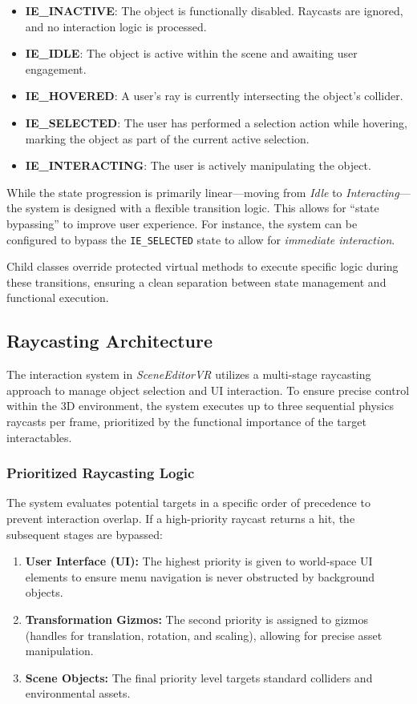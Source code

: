 \documentclass[inscr,ack,preface]{dithesis}
\begin{document}
\begin{itemize}
  \item \textbf{IE\_INACTIVE}: The object is functionally disabled. Raycasts are ignored, and no interaction logic is processed.
  \item \textbf{IE\_IDLE}: The object is active within the scene and awaiting user engagement.
  \item \textbf{IE\_HOVERED}: A user's ray is currently intersecting the object’s collider.
  \item \textbf{IE\_SELECTED}: The user has performed a selection action while hovering, marking the object as part of the current
        active selection.
  \item \textbf{IE\_INTERACTING}: The user is actively manipulating the object.
\end{itemize}

While the state progression is primarily linear—moving from \textit{Idle} to
\textit{Interacting}—the system is designed with a flexible transition logic.
This allows for ``state bypassing'' to improve user experience.
For instance, the system can be configured to bypass the \texttt{IE\_SELECTED}
state to allow for \textit{immediate interaction}.

Child classes override protected virtual methods to execute specific logic
during these transitions, ensuring a clean separation between state management and functional execution.
\subsection{Raycasting Architecture}

The interaction system in \textit{SceneEditorVR} utilizes a multi-stage raycasting approach
to manage object selection and UI interaction. To ensure precise control within the 3D environment,
the system executes up to three sequential physics raycasts per frame, prioritized by the functional importance of the target interactables.

\subsubsection{Prioritized Raycasting Logic}
The system evaluates potential targets in a specific order of precedence to prevent interaction overlap. If a high-priority raycast returns a hit,
the subsequent stages are bypassed:
\begin{enumerate}
  \item \textbf{User Interface (UI):} The highest priority is given to world-space UI elements to ensure menu navigation is never
        obstructed by background objects.
  \item \textbf{Transformation Gizmos:} The second priority is assigned to gizmos (handles for translation, rotation, and scaling),
        allowing for precise asset manipulation.
  \item \textbf{Scene Objects:} The final priority level targets standard colliders and environmental assets.
\end{enumerate}
\end{document}
